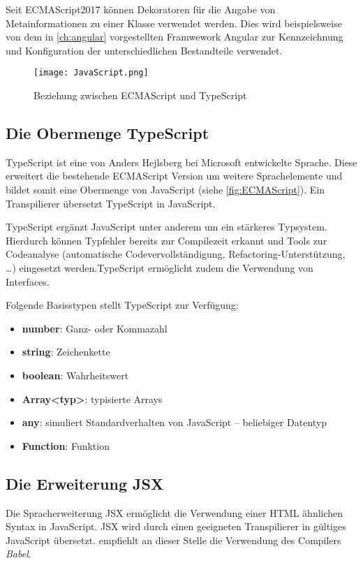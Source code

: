 Seit ECMAScript2017 können Dekoratoren für die Angabe von Metainformationen zu einer Klasse verwendet werden. Dies wird beispielsweise von dem in \autoref{ch:angular} vorgestellten Framwework Angular zur Kennzeichnung und Konfiguration der unterschiedlichen Bestandteile verwendet.\autocites[vgl.][30\psqq]{Woiwode.2018} 

\begin{figure}[h]
	\centering
	\texttt{[image: JavaScript.png]}
	\caption{Beziehung zwischen ECMAScript und TypeScript} 
	\label{fig:ECMAScript}
\end{figure}

\subsection{Die Obermenge TypeScript}\label{sec:ts}
TypeScript ist eine von Anders Hejlsberg bei Microsoft entwickelte Sprache. Diese erweitert die bestehende ECMAScript Version um weitere Sprachelemente und bildet somit eine Obermenge von JavaScript (siehe \autoref{fig:ECMAScript}). Ein Transpilierer übersetzt TypeScript in JavaScript. 

TypeScript ergänzt JavaScript unter anderem um ein stärkeres Typsystem. Hierdurch können Typfehler bereits zur Compilezeit erkannt und Tools zur Codeanalyse (automatische Codevervollständigung, Refactoring-Unterstützung, …) eingesetzt werden.\autocites[vgl.][27\psqq]{Woiwode.2018}[vgl.][13\psqq]{Steyer.2017}[vgl.][10]{Zeigermann.2016}TypeScript ermöglicht zudem die Verwendung von Interfaces. \autocites[vgl.][40\psq]{Woiwode.2018} 


Folgende Basisstypen stellt TypeScript zur Verfügung: \autocites[vgl.][34\psqq]{Woiwode.2018}[vgl.][16\psqq]{Steyer.2017}

\begin{itemize}
	\item  \textbf{number}: Ganz- oder Kommazahl
	\item \textbf{string}:  Zeichenkette
	\item \textbf{boolean}: Wahrheitswert
	\item \textbf{Array<typ>}: typisierte Arrays
	\item \textbf{any}: simuliert Standardverhalten von JavaScript  – beliebiger Datentyp
	\item \textbf{Function}: Funktion
\end{itemize}


\subsection{Die Erweiterung JSX}\label{sec:die-erweiterung-jsx}
\label{Babel}
Die Spracherweiterung JSX ermöglicht die Verwendung einer HTML ähnlichen Syntax in JavaScript. JSX wird durch einen geeigneten Transpilierer in gültiges JavaScript übersetzt.\textcite[vgl.][10]{Zeigermann.2016} empfiehlt an dieser Stelle die Verwendung des Compilers \textit{Babel}.

